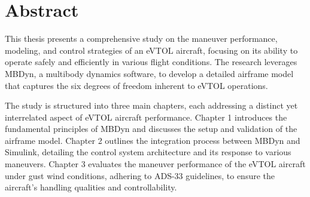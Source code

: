 \documentclass{Configuration_Files/PoliMi3i_thesis}
\begin{document}


\frontmatter %


\startpreamble
\setcounter{page}{1} %

\chapter*{Abstract}
This thesis presents a comprehensive study on the maneuver performance, modeling, and control strategies of an eVTOL aircraft, focusing on its ability to operate safely and efficiently in various flight conditions. The research leverages MBDyn, a multibody dynamics software, to develop a detailed airframe model that captures the six degrees of freedom inherent to eVTOL operations.

The study is structured into three main chapters, each addressing a distinct yet interrelated aspect of eVTOL aircraft performance. Chapter 1 introduces the fundamental principles of MBDyn and discusses the setup and validation of the airframe model. Chapter 2 outlines the integration process between MBDyn and Simulink, detailing the control system architecture and its response to various maneuvers. Chapter 3 evaluates the maneuver performance of the eVTOL aircraft under gust wind conditions, adhering to ADS-33 guidelines, to ensure the aircraft's handling qualities and controllability.
\end{document}
